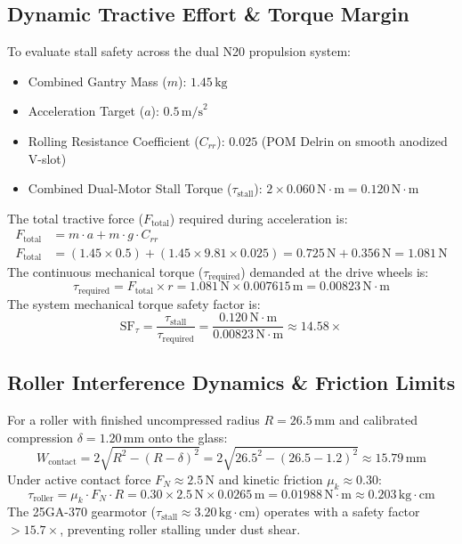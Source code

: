 \documentclass[10pt,a4paper]{article}
\begin{document}
\subsection{Dynamic Tractive Effort \& Torque Margin}
To evaluate stall safety across the dual N20 propulsion system:
\begin{itemize}[leftmargin=*]
    \item Combined Gantry Mass ($m$): $1.45\,\text{kg}$
    \item Acceleration Target ($a$): $0.5\,\text{m/s}^2$
    \item Rolling Resistance Coefficient ($C_{rr}$): $0.025$ (POM Delrin on smooth anodized V-slot)
    \item Combined Dual-Motor Stall Torque ($\tau_{\text{stall}}$): $2 \times 0.060\,\text{N}\cdot\text{m} = 0.120\,\text{N}\cdot\text{m}$
\end{itemize}
The total tractive force ($F_{\text{total}}$) required during acceleration is:
\begin{align}
    F_{\text{total}} &= m \cdot a + m \cdot g \cdot C_{rr} \\
    F_{\text{total}} &= (1.45 \times 0.5) + (1.45 \times 9.81 \times 0.025) = 0.725\,\text{N} + 0.356\,\text{N} = 1.081\,\text{N}
\end{align}
The continuous mechanical torque ($\tau_{\text{required}}$) demanded at the drive wheels is:
\begin{equation}
    \tau_{\text{required}} = F_{\text{total}} \times r = 1.081\,\text{N} \times 0.007615\,\text{m} = 0.00823\,\text{N}\cdot\text{m}
\end{equation}
The system mechanical torque safety factor is:
\begin{equation}
    \text{SF}_{\tau} = \frac{\tau_{\text{stall}}}{\tau_{\text{required}}} = \frac{0.120\,\text{N}\cdot\text{m}}{0.00823\,\text{N}\cdot\text{m}} \approx 14.58\times
\end{equation}

\subsection{Roller Interference Dynamics \& Friction Limits}
For a roller with finished uncompressed radius $R = 26.5\,\text{mm}$ and calibrated compression $\delta = 1.20\,\text{mm}$ onto the glass:
\begin{equation}
    W_{\text{contact}} = 2\sqrt{R^2 - (R - \delta)^2} = 2\sqrt{26.5^2 - (26.5 - 1.2)^2} \approx 15.79\,\text{mm}
\end{equation}
Under active contact force $F_N \approx 2.5\,\text{N}$ and kinetic friction $\mu_k \approx 0.30$:
\begin{equation}
    \tau_{\text{roller}} = \mu_k \cdot F_N \cdot R = 0.30 \times 2.5\,\text{N} \times 0.0265\,\text{m} = 0.01988\,\text{N}\cdot\text{m} \approx 0.203\,\text{kg}\cdot\text{cm}
\end{equation}
The 25GA-370 gearmotor ($\tau_{\text{stall}} \approx 3.20\,\text{kg}\cdot\text{cm}$) operates with a safety factor $>15.7\times$, preventing roller stalling under dust shear.
\end{document}

